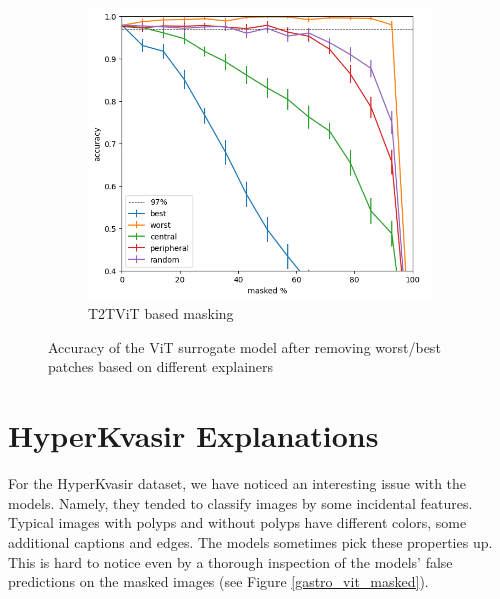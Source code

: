 \documentclass[magisterska,en]{pracamgr}
\begin{document}
\begin{figure}
\begin{subfigure}{.5\textwidth}
  \centering
  \includegraphics[width=1\linewidth]{./images/v_on_v_metrics.png}
  \caption{T2T\textunderscore ViT based masking }
  \label{fig:sub1}
\end{subfigure}


\caption{Accuracy of the ViT surrogate model after removing worst/best patches based on different explainers}
\label{fig:Different explainers metrics}
\end{figure}











\section{HyperKvasir Explanations}\label{s:HyperKvasir Explanations}

For the HyperKvasir dataset, we have noticed an interesting issue with the models. Namely, they tended to classify images by some incidental features. Typical images with polyps and without polyps have different colors, some additional captions and edges. The models sometimes pick these properties up. This is hard to notice even by a thorough inspection of the models' false predictions on the masked images (see Figure \ref{gastro_vit_masked}).
\end{document}
